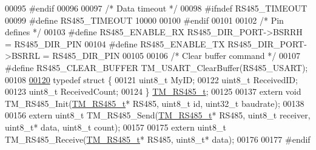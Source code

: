 \begin{DoxyCode}
00095 \textcolor{preprocessor}{#endif}
00096 
00097 \textcolor{comment}{/* Data timeout */}
00098 \textcolor{preprocessor}{#ifndef RS485\_TIMEOUT}
00099 \textcolor{preprocessor}{#define RS485\_TIMEOUT           10000}
00100 \textcolor{preprocessor}{#endif}
00101 
00102 \textcolor{comment}{/* Pin defines */}
00103 \textcolor{preprocessor}{#define RS485\_ENABLE\_RX         RS485\_DIR\_PORT->BSRRH = RS485\_DIR\_PIN}
00104 \textcolor{preprocessor}{#define RS485\_ENABLE\_TX         RS485\_DIR\_PORT->BSRRL = RS485\_DIR\_PIN}
00105 
00106 \textcolor{comment}{/* Clear buffer command */}
00107 \textcolor{preprocessor}{#define RS485\_CLEAR\_BUFFER      TM\_USART\_ClearBuffer(RS485\_USART);}
00108 
\hypertarget{tm__stm32f4__rs485_8h_source_l00120}{}\hyperlink{struct_t_m___r_s485__t}{00120} \textcolor{keyword}{typedef} \textcolor{keyword}{struct }\{
00121     uint8\_t MyID;
00122     uint8\_t ReceivedID;
00123     uint8\_t ReceivedCount;
00124 \} \hyperlink{struct_t_m___r_s485__t}{TM\_RS485\_t};
00125 
00137 \textcolor{keyword}{extern} \textcolor{keywordtype}{void} TM\_RS485\_Init(\hyperlink{struct_t_m___r_s485__t}{TM\_RS485\_t}* RS485, uint8\_t \textcolor{keywordtype}{id}, uint32\_t baudrate);
00138 
00156 \textcolor{keyword}{extern} uint8\_t TM\_RS485\_Send(\hyperlink{struct_t_m___r_s485__t}{TM\_RS485\_t}* RS485, uint8\_t receiver, uint8\_t* data, uint8\_t count);
00157 
00175 \textcolor{keyword}{extern} uint8\_t TM\_RS485\_Receive(\hyperlink{struct_t_m___r_s485__t}{TM\_RS485\_t}* RS485, uint8\_t* data);
00176 
00177 \textcolor{preprocessor}{#endif}
\end{DoxyCode}
